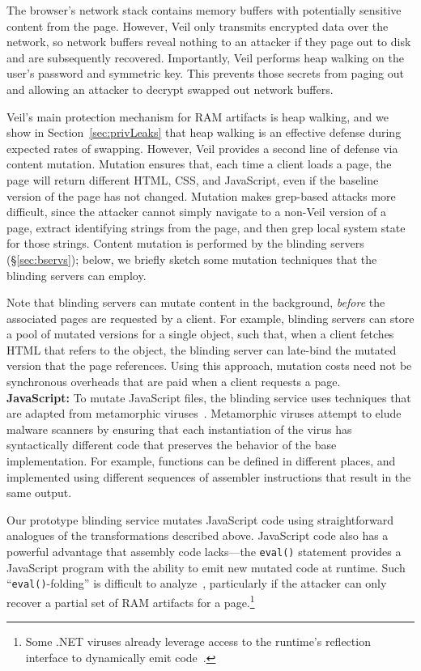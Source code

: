 The browser's network stack contains memory
buffers with potentially sensitive content
from the page. However, Veil only transmits
encrypted data over the network, so network
buffers reveal nothing to an attacker if
they page out to disk and are subsequently
recovered. Importantly, Veil performs
heap walking on the user's password and
symmetric key. This prevents those secrets
from paging out and allowing an attacker
to decrypt swapped out network buffers.

\label{sec:mutation}
Veil's main protection mechanism for RAM
artifacts is heap walking, and we show in
Section~\ref{sec:privLeaks} that heap walking
is an effective defense during expected rates
of swapping. However, Veil provides a second
line of defense via content mutation. Mutation
ensures that, each time a client loads a page,
the page will return different HTML, CSS, and
JavaScript, even if the baseline version of the
page has not changed. Mutation makes grep-based
attacks more difficult, since the attacker
cannot simply navigate to a non-Veil version
of a page, extract identifying strings from the
page, and then grep local system state for those
strings. Content mutation is performed by the
blinding servers (\S\ref{sec:bservs}); below,
we briefly sketch some mutation techniques
that the blinding servers can employ.

Note that blinding servers can mutate content
in the background, \textit{before} the associated
pages are requested by a client. For example,
blinding servers can store a pool of mutated
versions for a single object, such that, when
a client fetches HTML that refers to the
object, the blinding server can late-bind
the mutated version that the page references.
Using this approach, mutation costs need not
be synchronous overheads that are paid when
a client requests a page.\\

\noindent
{\bf JavaScript:} To mutate JavaScript files, the
blinding service uses techniques that are adapted
from metamorphic viruses~\cite{hunting06}. Metamorphic
viruses attempt to elude malware scanners by
ensuring that each instantiation of the virus has
syntactically different code that preserves the
behavior of the base implementation. For example,
functions can be defined in different places, and
implemented using different sequences of assembler
instructions that result in the same output.

Our prototype blinding service mutates JavaScript code
using straightforward analogues of the transformations
described above. JavaScript code also has
a powerful advantage that assembly code
lacks---the \texttt{eval()} statement provides a
JavaScript program with the ability to emit new
mutated code at runtime. Such ``\texttt{eval()}-folding''
is difficult to analyze~\cite{zozzle}, particularly
if the attacker can only recover a partial set of
RAM artifacts for a page.\footnote{Some .NET viruses
	already leverage access to the runtime's reflection
	interface to dynamically emit code~\cite{szor05}.}

